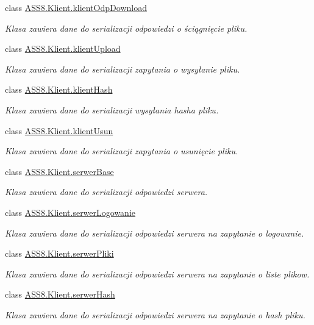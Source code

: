 \begin{CompactItemize}
class \hyperlink{a00010}{ASS8.Klient.klientOdpDownload}
\begin{CompactList}\small\item\em Klasa zawiera dane do serializacji odpowiedzi o ściągnięcie pliku. \item\end{CompactList}\item 
class \hyperlink{a00011}{ASS8.Klient.klientUpload}
\begin{CompactList}\small\item\em Klasa zawiera dane do serializacji zapytania o wysyłanie pliku. \item\end{CompactList}\item 
class \hyperlink{a00008}{ASS8.Klient.klientHash}
\begin{CompactList}\small\item\em Klasa zawiera dane do serializacji wysyłania hasha pliku. \item\end{CompactList}\item 
class \hyperlink{a00012}{ASS8.Klient.klientUsun}
\begin{CompactList}\small\item\em Klasa zawiera dane do serializacji zapytania o usunięcie pliku. \item\end{CompactList}\item 
class \hyperlink{a00023}{ASS8.Klient.serwerBase}
\begin{CompactList}\small\item\em Klasa zawiera dane do serializacji odpowiedzi serwera. \item\end{CompactList}\item 
class \hyperlink{a00025}{ASS8.Klient.serwerLogowanie}
\begin{CompactList}\small\item\em Klasa zawiera dane do serializacji odpowiedzi serwera na zapytanie o logowanie. \item\end{CompactList}\item 
class \hyperlink{a00026}{ASS8.Klient.serwerPliki}
\begin{CompactList}\small\item\em Klasa zawiera dane do serializacji odpowiedzi serwera na zapytanie o liste plikow. \item\end{CompactList}\item 
class \hyperlink{a00024}{ASS8.Klient.serwerHash}
\begin{CompactList}\small\item\em Klasa zawiera dane do serializacji odpowiedzi serwera na zapytanie o hash pliku. \item\end{CompactList}\end{CompactItemize}
